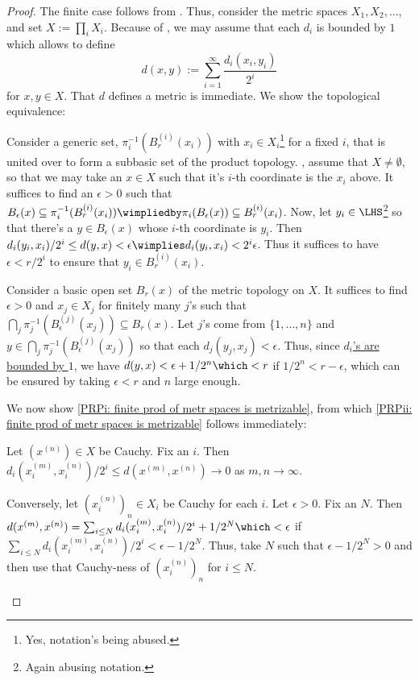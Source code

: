 	\begin{proof}
		The finite case follows from . Thus, consider the metric spaces $X_1, X_2, \ldots$, and set $X := \prod_i X_i$. Because of , we may \wlogg assume that each $d_i$ is bounded by $1$ which allows to define
		\[
		d(x, y) := \sum_{i = 1}^\infty \frac{d_i(x_i, y_i)}{2^i}
		\]
		for $x, y\in X$. That $d$ defines a metric is immediate. We show the topological equivalence:
		\begin{prooflist}
			\item Consider a generic set, $\pi_i^{-1}(B^{(i)}_r(x_i))$ with $x_i\in X_i$\footnote{
				Yes, notation's being abused.
			} for a fixed $i$, that is united over to form a subbasic set of the product topology. \Wlogg, assume that $X\ne \emptyset$, so that we may take an $x\in X$ such that it's $i$-th coordinate is the $x_i$ above. It suffices to find an $\epsilon > 0$ such that $B_\epsilon(x)\subseteq \pi_i^{-1}( B^{(i)}_r(x_i) )\wimpliedby \pi_i(B_\epsilon(x))\subseteq B^{(i)}_r(x_i)$. Now, let $y_i\in \LHS$\footnote{
				Again abusing notation.
			} so that there's a $y\in B_\epsilon(x)$ whose $i$-th coordinate is $y_i$. Then $d_i(y_i, x_i)/2^i\le d(y, x) < \epsilon\wimplies d_i(y_i, x_i) < 2^i \epsilon$. Thus it suffices to have $\epsilon < r/2^i$ to ensure that $y_i\in B^{(i)}_r(x_i)$.
			
			\item Consider a basic open set $B_r(x)$ of the metric topology on $X$. It suffices to find $\epsilon > 0$ and $x_j\in X_j$ for finitely many $j$'s such that $\bigcap_j \pi_j^{-1}(B^{(j)}_\epsilon(x_j))\subseteq B_r(x)$. Let $j$'s come from $\{1, \ldots, n\}$ and $y\in \bigcap_j \pi_j^{-1}(B^{(j)}_\epsilon(x_j))$ so that each $d_j(y_j, x_j) < \epsilon$. Thus, since \uline{$d_i$'s are bounded by $1$}, we have $d(y, x) < \epsilon + 1/2^n\which < r$ if $1/2^n < r - \epsilon$, which can be ensured by taking $\epsilon < r$ and $n$ large enough.
		\end{prooflist}
		
		We now show \ref{PRPi: finite prod of metr spaces is metrizable}, from which \ref{PRPii: finite prod of metr spaces is metrizable} follows immediately:
		\begin{subproof}
			Let $(x^{(n)})\in X$ be Cauchy. Fix an $i$. Then $d_i(x^{(m)}_i, x^{(n)}_i)/2^i\le d(x^{(m)}, x^{(n)})\to 0$ as $m, n\to\infty$.
			
			Conversely, let $(x^{(n)}_i)_n\in X_i$ be Cauchy for each $i$. Let $\epsilon > 0$. Fix an $N$. Then $d(x^{(m)}, x^{(n)}) = \sum_{i\le N} d_i(x^{(m)}_i, x^{(n)}_i)/2^i + 1/2^N\which < \epsilon$ if $\sum_{i\le N} d_i(x^{(m)}_i, x^{(n)}_i)/2^i < \epsilon - 1/2^N$. Thus, take $N$ such that $\epsilon - 1/2^N > 0$ and then use that Cauchy-ness of $(x^{(n)}_i)_n$ for $i\le N$.
		\end{subproof}
	\end{proof}
	
